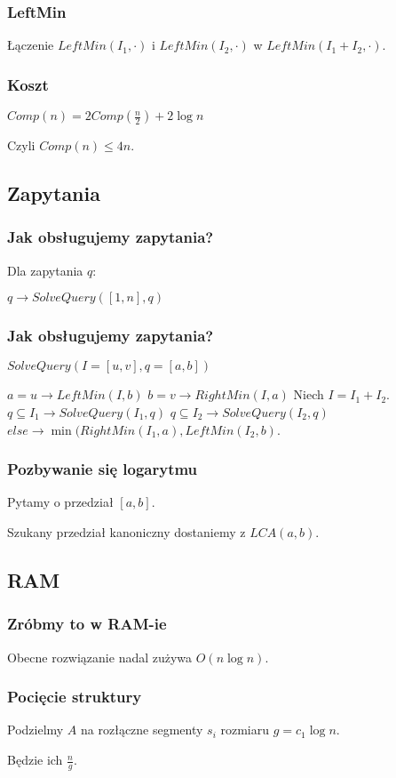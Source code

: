 \documentclass{beamer}
\begin{document}
\begin{frame} \frametitle{LeftMin}
 Łączenie $LeftMin(I_1,\cdot)$ i $LeftMin(I_2,\cdot)$ w $LeftMin(I_1 + I_2,\cdot)$.
\end{frame}

\begin{frame} \frametitle{Koszt}
 $Comp(n) = 2 Comp(\frac{n}{2}) + 2 \log n$
 
 Czyli $Comp(n) \leq 4 n$.
\end{frame}

\subsection{Zapytania}
\begin{frame} \frametitle{Jak obsługujemy zapytania?}
 Dla zapytania $q$:
 
 $q \rightarrow SolveQuery([1,n], q)$
\end{frame}

\begin{frame} \frametitle{Jak obsługujemy zapytania?}
 $SolveQuery(I=[u,v], q=[a,b])$

 $a = u \rightarrow LeftMin(I, b)$ \linebreak
 $b = v \rightarrow RightMin(I, a)$\linebreak
 Niech $I = I_1 + I_2$.\linebreak
 $q \subseteq I_1 \rightarrow SolveQuery(I_1, q)$\linebreak
 $q \subseteq I_2 \rightarrow SolveQuery(I_2, q)$\linebreak
 $else \rightarrow \min (RightMin(I_1, a), LeftMin(I_2, b)$.
  
\end{frame}

\begin{frame} \frametitle{Pozbywanie się logarytmu}
Pytamy o przedział $[a,b]$.

Szukany przedział kanoniczny dostaniemy z $LCA(a,b)$.
\end{frame}

\subsection{RAM}
\begin{frame} \frametitle{Zróbmy to w RAM-ie}
 Obecne rozwiązanie nadal zużywa $O(n \log n)$.
\end{frame}

\begin{frame} \frametitle{Pocięcie struktury}
 Podzielmy $A$ na rozłączne segmenty $s_i$ rozmiaru $g = c_1 \log n$.
 
 Będzie ich $\frac{n}{g}$.
\end{frame}
\end{document}
